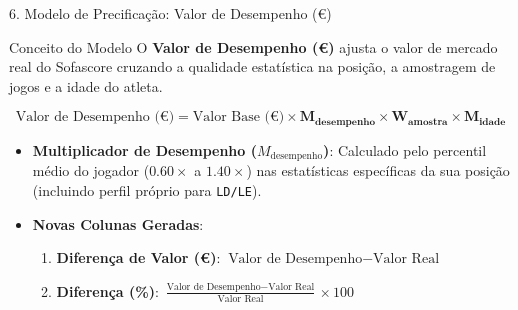 \documentclass[aspectratio=169, 10pt]{beamer}
\begin{document}
\begin{frame}{6. Modelo de Precificação: Valor de Desempenho (€)}
  \begin{block}{Conceito do Modelo}
    O \textbf{Valor de Desempenho (€)} ajusta o valor de mercado real do Sofascore cruzando a qualidade estatística na posição, a amostragem de jogos e a idade do atleta.
  \end{block}

  \begin{equation*}
    \text{Valor de Desempenho (€)} = \text{Valor Base (€)} \times \mathbf{M_{\text{desempenho}}} \times \mathbf{W_{\text{amostra}}} \times \mathbf{M_{\text{idade}}}
  \end{equation*}

  \begin{itemize}
    \item \textbf{Multiplicador de Desempenho ($M_{\text{desempenho}}$)}: Calculado pelo percentil médio do jogador ($0.60\times$ a $1.40\times$) nas estatísticas específicas da sua posição (incluindo perfil próprio para \texttt{LD/LE}).
    \item \textbf{Novas Colunas Geradas}:
      \begin{enumerate}
        \item \textbf{Diferença de Valor (€)}: $\text{Valor de Desempenho} - \text{Valor Real}$
        \item \textbf{Diferença (\%)}: $\frac{\text{Valor de Desempenho} - \text{Valor Real}}{\text{Valor Real}} \times 100$
      \end{enumerate}
  \end{itemize}
\end{frame}
\end{document}
